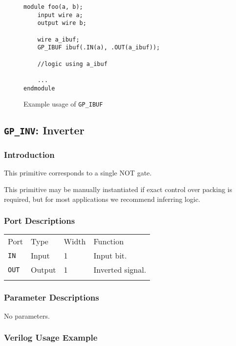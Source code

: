 \documentclass[11pt]{article}
\newcommand{\tokenstyle}[1]{\texttt{#1}}
\newcommand{\whenstyle}[1]{{\fontseries{sb}\selectfont#1}}
\newcommand{\thinhline}{\Xhline{1\arrayrulewidth}}
\newcommand{\thickhline}{\Xhline{2.5\arrayrulewidth}}
\begin{document}
\begin{figure}[h]
\begin{lstlisting}
module foo(a, b);
	input wire a;
	output wire b;

	wire a_ibuf;
	GP_IBUF ibuf(.IN(a), .OUT(a_ibuf));

	//logic using a_ibuf

	...
endmodule
\end{lstlisting}
\caption{Example usage of \tokenstyle{GP\_IBUF}}
\label{gp-ibuf-example}
\end{figure}


\pagebreak
\subsection{\tokenstyle{GP\_INV}: Inverter}
\label{gp-inv}

\subsubsection{Introduction}
This primitive corresponds to a single NOT gate.

This primitive may be manually instantiated if exact control over packing is required, but for most applications we
recommend inferring logic.

\subsubsection{Port Descriptions}

\begin{tabularx}{\textwidth}{lllX}
\thinhline
\whenstyle{Port} & \whenstyle{Type} & \whenstyle{Width} & \whenstyle{Function} \\
\thickhline
\tokenstyle{IN} & Input & 1 & Input bit. \\
\thinhline
\tokenstyle{OUT} & Output & 1 & Inverted signal. \\
\thinhline
\end{tabularx}

\subsubsection{Parameter Descriptions}

No parameters.

\subsubsection{Verilog Usage Example}
\end{document}
